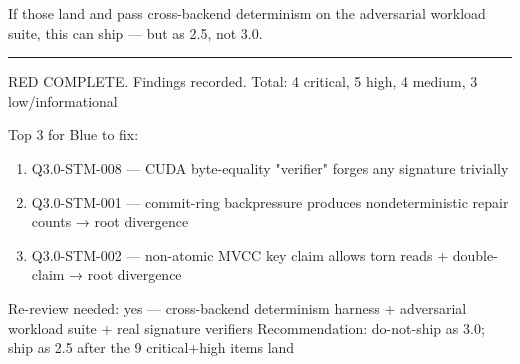 \documentclass[
]{article}
\providecommand{\tightlist}{%
  \setlength{\itemsep}{0pt}\setlength{\parskip}{0pt}}
\begin{document}
If those land and pass cross-backend determinism on the adversarial
workload suite, this can ship --- but as 2.5, not 3.0.

\begin{center}\rule{0.5\linewidth}{0.5pt}\end{center}

RED COMPLETE. Findings recorded. Total: 4 critical, 5 high, 4 medium, 3
low/informational

Top 3 for Blue to fix:

\begin{enumerate}
\def\labelenumi{\arabic{enumi}.}
\tightlist
\item
  Q3.0-STM-008 --- CUDA byte-equality "verifier" forges any signature
  trivially
\item
  Q3.0-STM-001 --- commit-ring backpressure produces nondeterministic
  repair counts → root divergence
\item
  Q3.0-STM-002 --- non-atomic MVCC key claim allows torn reads +
  double-claim → root divergence
\end{enumerate}

Re-review needed: yes --- cross-backend determinism harness +
adversarial workload suite + real signature verifiers Recommendation:
do-not-ship as 3.0; ship as 2.5 after the 9 critical+high items land
\end{document}
